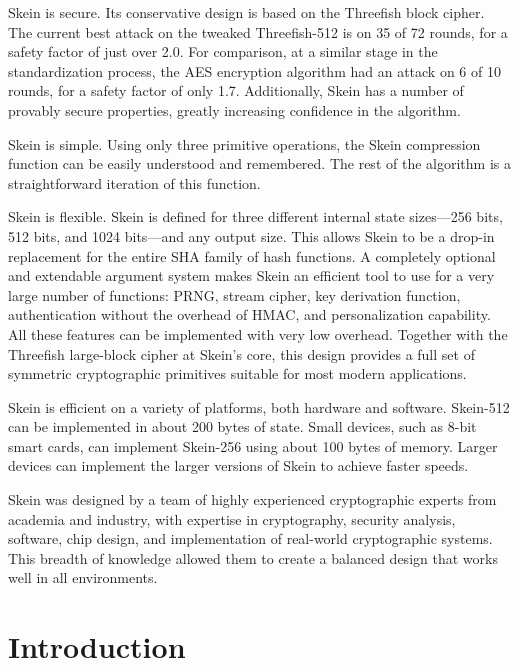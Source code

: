 \documentclass[11pt,twoside]{article}
\let\mycleardoublepage=\cleardoublepage
\def\cleardoublepage{\clearpage\pagestyle{empty}\mycleardoublepage\pagestyle{plain}}
\begin{document}
Skein is secure.  Its conservative design is based on the Threefish
block cipher.  The current best attack on the tweaked Threefish-512 is
on 35 of 72 rounds, for a safety factor of just over 2.0. For
comparison, at a similar stage in the standardization process, the AES
encryption algorithm had an attack on 6 of 10 rounds, for a safety
factor of only 1.7.  Additionally, Skein has a number of provably
secure properties, greatly increasing confidence in the
algorithm.

Skein is simple.  Using only three primitive operations, the Skein compression function can be easily understood and remembered.  The rest of the algorithm is a straightforward iteration of this function.

Skein is flexible.  Skein is defined for three different internal state sizes---256 bits, 512 bits, and 1024 bits---and any output size.  This allows Skein to be a drop-in replacement for the entire SHA family of hash functions.  A completely optional and extendable argument system makes Skein an efficient tool to use for a very large number of functions: PRNG, stream cipher, key derivation function, authentication without the overhead of HMAC, and personalization capability.  All these features can be implemented with very low overhead.  Together with the Threefish large-block cipher at Skein's core, this design provides a full set of symmetric cryptographic primitives suitable for most modern applications.

Skein is efficient on a variety of platforms, both hardware and software.  Skein-512 can be implemented in about 200 bytes of state.  Small devices, such as 8-bit smart cards, can implement Skein-256 using about 100 bytes of memory.  Larger devices can implement the larger versions of Skein to achieve faster speeds.

Skein was designed by a team of highly experienced cryptographic experts from academia and industry, with expertise in cryptography, security analysis, software, chip design, and implementation of real-world cryptographic systems.  This breadth of knowledge allowed them to create a balanced design that works well in all environments.

\cleardoublepage

\tableofcontents

\cleardoublepage
{}

\section{Introduction}
\end{document}
